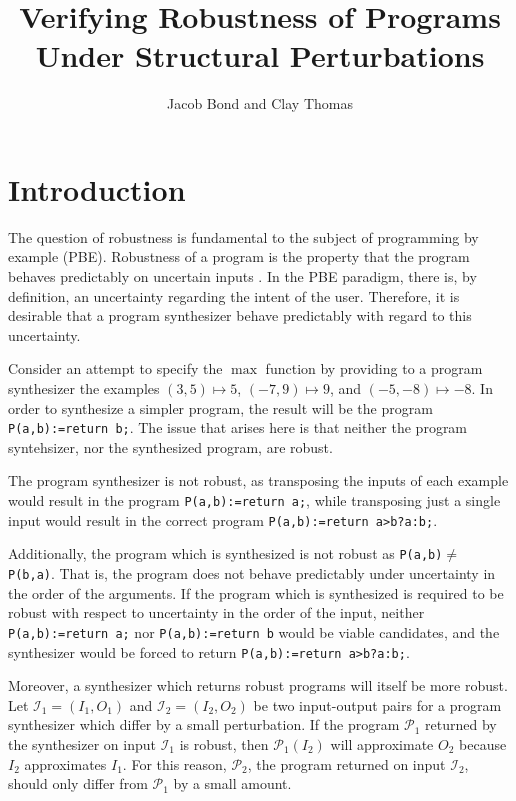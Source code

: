 \documentclass{llncs}
\title{Verifying Robustness of Programs Under Structural Perturbations}
\author{Jacob Bond and Clay Thomas}
\institute{Purdue University}
\begin{document}
\maketitle


\section{Introduction}

The question of robustness is fundamental to the subject of programming by
example (PBE).  Robustness of a program is the property that the program behaves
predictably on uncertain inputs \cite{chaudhuri12}.  In the PBE paradigm, there
is, by definition, an uncertainty regarding the intent of the user.  Therefore,
it is desirable that a program synthesizer behave predictably with regard to
this uncertainty.

Consider an attempt to specify the \(\max\) function by providing to a program
synthesizer the examples \((3, 5) \mapsto 5\), \((-7, 9) \mapsto 9\), and
\((-5, -8) \mapsto -8\).  In order to synthesize a simpler program, the
result will be the program \verb!P(a,b):=return b;!.  The issue that arises here
is that neither the program syntehsizer, nor the synthesized program, are
robust.

The program synthesizer is not robust, as transposing the inputs of each example
would result in the program \verb!P(a,b):=return a;!, while transposing just a
single input would result in the correct program \verb!P(a,b):=return a>b?a:b;!.

Additionally, the program which is synthesized is not robust as
\verb!P(a,b)!\(\not=\) \verb!P(b,a)!.  That is, the program does not behave
predictably under uncertainty in the order of the arguments.  If the program
which is synthesized is required to be robust with respect to uncertainty in the
order of the input, neither \verb!P(a,b):=return a;! nor \verb!P(a,b):=return b!
would be viable candidates, and the synthesizer would be forced to return
\verb!P(a,b):=return a>b?a:b;!.

Moreover, a synthesizer which returns robust programs will itself be more
robust.  Let \(\mathcal{I}_{1} = (I_{1}, O_{1})\) and \(\mathcal{I}_{2} =
(I_{2}, O_{2})\) be two input-output pairs for a program synthesizer which
differ by a small perturbation.  If the program \(\mathcal{P}_{1}\) returned by
the synthesizer on input \(\mathcal{I}_{1}\) is robust, then
\(\mathcal{P}_{1}(I_{2})\) will approximate \(O_{2}\) because \(I_{2}\)
approximates \(I_{1}\).  For this reason, \(\mathcal{P}_{2}\), the program
returned on input \(\mathcal{I}_{2}\), should only differ from
\(\mathcal{P}_{1}\) by a small amount.
\end{document}
